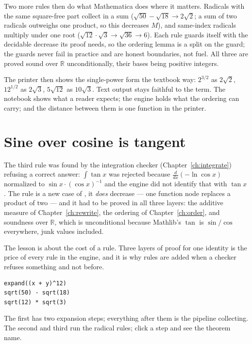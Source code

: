 Two more rules then do what Mathematica does where it matters. Radicals with the same square-free
part collect in a sum ($\sqrt{50} - \sqrt{18} \to 2\sqrt 2$; a sum of two radicals outweighs one
product, so this decreases $M$), and same-index radicals multiply under one root ($\sqrt{12} \cdot
\sqrt 3 \to \sqrt{36} \to 6$). Each rule guards itself with the decidable decrease its proof needs,
so the ordering lemma is a split on the guard; the guards never fail in practice and are honest
boundaries, not fuel. All three are proved sound over $\mathbb{R}$ unconditionally, their bases
being positive integers.

The printer then shows the single-power form the textbook way: $2^{3/2}$ as $2\sqrt 2$,
$12^{1/2}$ as $2\sqrt 3$, $5\sqrt{12}$ as $10\sqrt 3$. Text output stays faithful to the term. The
notebook shows what a reader expects; the engine holds what the ordering can carry; and the
distance between them is one function in the printer.

\section{Sine over cosine is tangent}

The third rule was found by the integration checker (Chapter~\ref{ch:integrate}) refusing a
correct answer: $\int \tan x$ was rejected because $\frac{d}{dx}(-\ln \cos x)$ normalized to
$\sin x \cdot (\cos x)^{-1}$ and the engine did not identify that with $\tan x$. The rule is a new
case of , it \emph{does} decrease --- one function node replaces a product of two
--- and it had to be proved in all three layers: the additive measure of Chapter~\ref{ch:rewrite},
the ordering of Chapter~\ref{ch:order}, and soundness over $\mathbb{R}$, which is unconditional
because Mathlib's $\tan$ is $\sin/\cos$ everywhere, junk values included.

The lesson is about the cost of a rule. Three layers of proof for one identity is the price of
every rule in the engine, and it is why rules are added when a checker refuses something and not
before.

\begin{trybox}
\begin{verbatim}
expand((x + y)^12)
sqrt(50) - sqrt(18)
sqrt(12) * sqrt(3)
\end{verbatim}
  The first has two expansion steps; everything after them is the pipeline collecting. The second and third run the radical rules; click a step and
  see the theorem name.
\end{trybox}

